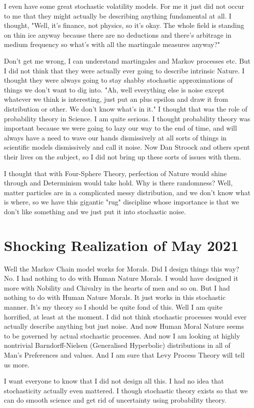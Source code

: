 \documentclass{amsart}
\begin{document}
I even have some great stochastic volatility models.  For me it just did not occur to me that they might actually be describing anything fundamental at all.  I thought, "Well, it's finance, not physics, so it's okay.  The whole field is standing on thin ice anyway because there are no deductions and there's arbitrage in medium frequency so what's with all the martingale measures anyway?"

Don't get me wrong, I can understand martingales and Markov processes etc.  But I did not think that they were actually ever going to describe intrinsic Nature.  I thought they were always going to stay shabby stochastic approximations of things we don't want to dig into.  "Ah, well everything else is noise except whatever we think is interesting, just put an plus epsilon and draw it from distribution or other.  We don't know what's in it."  I thought that was the role of probability theory in Science.  I am quite serious.  I thought probability theory was important because we were going to lazy our way to the end of time, and will always have a need to wave our hands dismissively at all sorts of things in scientific models dismissively and call it noise.  Now Dan Stroock and others spent their lives on the subject, so I did not bring up these sorts of issues with them.

I thought that with Four-Sphere Theory, perfection of Nature would shine through and Determinism would take hold.  Why is there randomness?  Well, matter particles are in a complicated messy distribution, and we don't know what is where, so we have this gigantic "rug" discipline whose importance is that we don't like something and we just put it into stochastic noise.  

\section{Shocking Realization of May 2021}

Well the Markov Chain model works for Morals.  Did I design things this way?  No.  I had nothing to do with Human Nature Morals.  I would have designed it more with Nobility and Chivalry in the hearts of men and so on.  But I had nothing to do with Human Nature Morals.  It just works in this stochastic manner.  It's my theory so I should be quite fond of this.  Well I am quite horrified, at least at the moment.  I did not think stochastic processes would ever actually describe anything but just noise.  And now Human Moral Nature seems to be governed by actual stochastic processes.  And now I am looking at highly nontrivial Barndorff-Nielsen (Generalised Hyperbolic) distributions in all of Man's Preferences and values.  And I am sure that Levy Process Theory will tell us more.

I want everyone to know that I did not design all this.  I had no idea that stochasticity actually even mattered.  I though stochastic theory exists so that we can do smooth science and get rid of uncertainty using probability theory.
\end{document}
